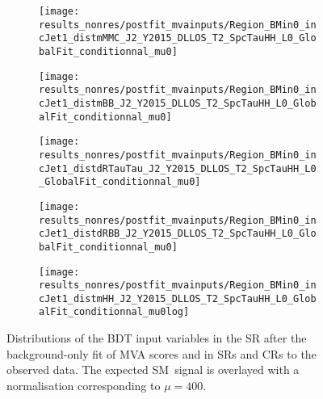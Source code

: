 \begin{figure}[htbp]
  \centering

  \begin{subfigure}{0.46\textwidth}
    \texttt{[image: results\_nonres/postfit\_mvainputs/Region\_BMin0\_incJet1\_distmMMC\_J2\_Y2015\_DLLOS\_T2\_SpcTauHH\_L0\_GlobalFit\_conditionnal\_mu0]}
  \end{subfigure}\hfill%
  \begin{subfigure}{0.46\textwidth}
    \texttt{[image: results\_nonres/postfit\_mvainputs/Region\_BMin0\_incJet1\_distmBB\_J2\_Y2015\_DLLOS\_T2\_SpcTauHH\_L0\_GlobalFit\_conditionnal\_mu0]}
  \end{subfigure}

  \begin{subfigure}{0.46\textwidth}
    \texttt{[image: results\_nonres/postfit\_mvainputs/Region\_BMin0\_incJet1\_distdRTauTau\_J2\_Y2015\_DLLOS\_T2\_SpcTauHH\_L0\_GlobalFit\_conditionnal\_mu0]}
  \end{subfigure}\hfill%
  \begin{subfigure}{0.46\textwidth}
    \texttt{[image: results\_nonres/postfit\_mvainputs/Region\_BMin0\_incJet1\_distdRBB\_J2\_Y2015\_DLLOS\_T2\_SpcTauHH\_L0\_GlobalFit\_conditionnal\_mu0]}
  \end{subfigure}

  \begin{subfigure}{0.46\textwidth}
    \texttt{[image: results\_nonres/postfit\_mvainputs/Region\_BMin0\_incJet1\_distmHH\_J2\_Y2015\_DLLOS\_T2\_SpcTauHH\_L0\_GlobalFit\_conditionnal\_mu0log]}
  \end{subfigure}

  \caption{Distributions of the BDT input variables in the \hadhad SR after the
    background-only fit of MVA scores and \mll in SRs and CRs to the observed
    data. The expected SM~\HH signal is overlayed with a normalisation
    corresponding to $\mu = 400$.}%
  \label{fig:postfit_mva_inputs}
\end{figure}


